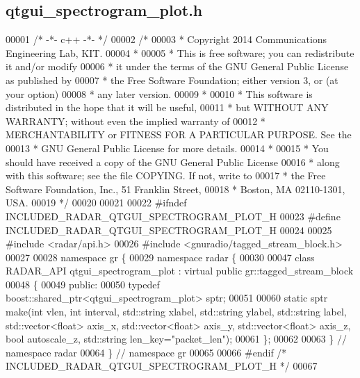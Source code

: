 \subsection{qtgui\+\_\+spectrogram\+\_\+plot.\+h}
\label{qtgui__spectrogram__plot_8h_source}

\begin{DoxyCode}
00001 \textcolor{comment}{/* -*- c++ -*- */}
00002 \textcolor{comment}{/* }
00003 \textcolor{comment}{ * Copyright 2014 Communications Engineering Lab, KIT.}
00004 \textcolor{comment}{ * }
00005 \textcolor{comment}{ * This is free software; you can redistribute it and/or modify}
00006 \textcolor{comment}{ * it under the terms of the GNU General Public License as published by}
00007 \textcolor{comment}{ * the Free Software Foundation; either version 3, or (at your option)}
00008 \textcolor{comment}{ * any later version.}
00009 \textcolor{comment}{ * }
00010 \textcolor{comment}{ * This software is distributed in the hope that it will be useful,}
00011 \textcolor{comment}{ * but WITHOUT ANY WARRANTY; without even the implied warranty of}
00012 \textcolor{comment}{ * MERCHANTABILITY or FITNESS FOR A PARTICULAR PURPOSE.  See the}
00013 \textcolor{comment}{ * GNU General Public License for more details.}
00014 \textcolor{comment}{ * }
00015 \textcolor{comment}{ * You should have received a copy of the GNU General Public License}
00016 \textcolor{comment}{ * along with this software; see the file COPYING.  If not, write to}
00017 \textcolor{comment}{ * the Free Software Foundation, Inc., 51 Franklin Street,}
00018 \textcolor{comment}{ * Boston, MA 02110-1301, USA.}
00019 \textcolor{comment}{ */}
00020 
00021 
00022 \textcolor{preprocessor}{#ifndef INCLUDED\_RADAR\_QTGUI\_SPECTROGRAM\_PLOT\_H}
00023 \textcolor{preprocessor}{#define INCLUDED\_RADAR\_QTGUI\_SPECTROGRAM\_PLOT\_H}
00024 
00025 \textcolor{preprocessor}{#include <radar/api.h>}
00026 \textcolor{preprocessor}{#include <gnuradio/tagged\_stream\_block.h>}
00027 
00028 \textcolor{keyword}{namespace }gr \{
00029   \textcolor{keyword}{namespace }radar \{
00030 
00047     \textcolor{keyword}{class }RADAR_API qtgui_spectrogram_plot : \textcolor{keyword}{virtual} \textcolor{keyword}{public} gr::tagged\_stream\_block
00048     \{
00049      \textcolor{keyword}{public}:
00050       \textcolor{keyword}{typedef} boost::shared\_ptr<qtgui\_spectrogram\_plot> sptr;
00051 
00060       \textcolor{keyword}{static} sptr make(\textcolor{keywordtype}{int} vlen, \textcolor{keywordtype}{int} interval, std::string xlabel, std::string ylabel, 
      std::string label, std::vector<float> axis\_x, std::vector<float> axis\_y, std::vector<float> axis\_z, \textcolor{keywordtype}{bool} 
      autoscale\_z, std::string len\_key=\textcolor{stringliteral}{"packet\_len"});
00061     \};
00062 
00063   \} \textcolor{comment}{// namespace radar}
00064 \} \textcolor{comment}{// namespace gr}
00065 
00066 \textcolor{preprocessor}{#endif }\textcolor{comment}{/* INCLUDED\_RADAR\_QTGUI\_SPECTROGRAM\_PLOT\_H */}\textcolor{preprocessor}{}
00067 
\end{DoxyCode}
